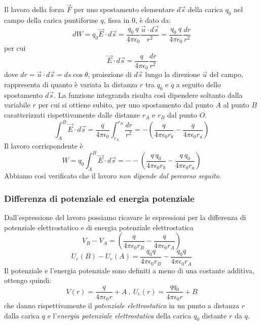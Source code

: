 \documentclass[class=book, crop=false, oneside, 12pt]{standalone}
\begin{document}
Il lavoro della forza \(\overrightarrow{F}\) per uno spostamento elementare \(d \overrightarrow{s}\) della carica \(q_0\) nel campo della carica puntiforme \(q\), fissa in \(0\), è dato da:
\begin{equation*}
    d W = q_0 \overrightarrow{E} \cdot d \overrightarrow{s} = \frac{q_0 \ q}{4 \pi \epsilon_0} \frac{\overrightarrow{u} \cdot d \overrightarrow{s}}{r^2} = \frac{q_0 \ q}{ 4 \pi \epsilon_0} \frac{d r }{r^2}
\end{equation*}
per cui
\begin{equation*}
    \overrightarrow{E} \cdot d \overrightarrow{s} = \frac{q}{4 \pi \epsilon_0} \frac{d r }{r^2}
\end{equation*}
dove \(dr = \overrightarrow{u} \cdot d \overrightarrow{s} = ds \cos \theta\), proiezione di \(d \overrightarrow{s}\) lungo la direzione \(\overrightarrow{u}\) del campo, rappresenta di quanto è variata la distanza \(r\) tra \(q_0\) e \(q\) a seguito dello spostamento \(d \overrightarrow{s}\).  
La funzione integranda risulta così dipendere soltanto dalla variabile \(r\) per cui si ottiene subito, per uno spostamento dal punto \(A\) al punto \(B\) caratterizzati rispettivamente dalle distanze \(r_A\) e \(r_B\) dal punto \(O\).
\begin{equation}
    \int_A^B \overrightarrow{E} \cdot d \overrightarrow{s} = \frac{q}{4 \pi \epsilon_0} \int_{r_A}^{r_B} \frac{dr}{r^2} = - \left(\frac{q}{4 \pi \epsilon_0 r_b} - \frac{q}{4 \pi \epsilon_0 r_a}\right)
\end{equation}
Il lavoro corrispondente è
\begin{equation}
    W = q_0 \int_A^B \overrightarrow{E} \cdot d \overrightarrow{s} = -- \left (\frac{q \ q_0}{4 \pi \epsilon_0 r_b} - \frac{q \ q_0}{4 \pi \epsilon_0 r_a}\right)
\end{equation}
Abbiamo così verificato che il lavoro \emph{non dipende dal percorso seguito}.

\subsubsection*{Differenza di potenziale ed energia potenziale}

Dall'espressione del lavoro possiamo ricavare le espressioni per la differenza di potenziale elettrostatico e di energia potenziale elettrostatica
\begin{equation}
    V_B - V_A = \left(\frac{q}{4 \pi \epsilon_0 r_B} - \frac{q}{4 \pi \epsilon_0 r_A}\right)
\end{equation}
\begin{equation}
    U_e(B) - U_e(A) = \frac{q_0 q}{4 \pi \epsilon_0 r_B} - \frac{q_0 q}{4 \pi \epsilon_0 r_A}
\end{equation}
Il potenziale e l'energia potenziale sono definiti a meno di una costante additiva, ottengo quindi:
\begin{equation*}
    V(r) = \frac{q}{4 \pi \epsilon_0 r} + A \ , \ U_e(r) = \frac{q q_0}{4 \pi \epsilon_0 r} + B 
\end{equation*}
che danno rispettivamente il \emph{potenziale elettrostatico} in un punto a distanza \(r\) dalla carica \(q\) e l'\emph{energia potenziale elettrostatica} della carica \(q_0\) distante \(r\) da \(q\). 
\end{document}
